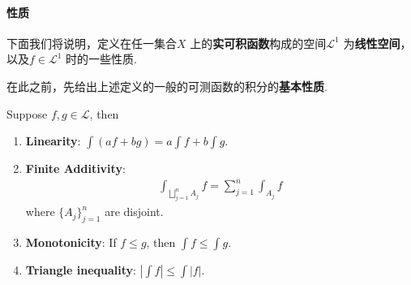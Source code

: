  \newpage
 
 \paragraph{性质}
 	下面我们将说明，定义在任一集合$X$ 上的\textbf{实可积函数}构成的空间$\mathcal{L}^1$ 为\textbf{线性空间}，以及$f \in \mathcal{L}^1$ 时的一些性质.
 	
 	\vspace{2em}
 	在此之前，先给出上述定义的一般的可测函数的积分的\textbf{基本性质}.
 	\begin{proposition}\label{prop 3.1.4}
 		Suppose $f , g \in \mathcal{L}$, then
 		\begin{enumerate}
 			\item \textbf{Linearity}: $\int{(af + bg)} = a\int{f} + b\int{g}$.
 			
 			\vspace{1em}
 			
 			\item \textbf{Finite Additivity}: 
 			\begin{align}
 				\int_{\bigsqcup_{j = 1}^{n}{A_j}}{f} = \sum_{j = 1}^{n}{\int_{A_j}{f}}
 			\end{align}
 			where $\{ A_j \}_{j = 1}^{n}$ are disjoint.
 			
 			\vspace{1em}
 			
 			\item \textbf{Monotonicity}: If $f \leq g$, then $\int{f} \leq \int{g}$.
 			
 			\vspace{1em}
 			
 			\item \textbf{Triangle inequality}: $\left| \int{f} \right| \leq \int{\left| f \right|}$.
 		\end{enumerate}
 	

\end{proposition}
